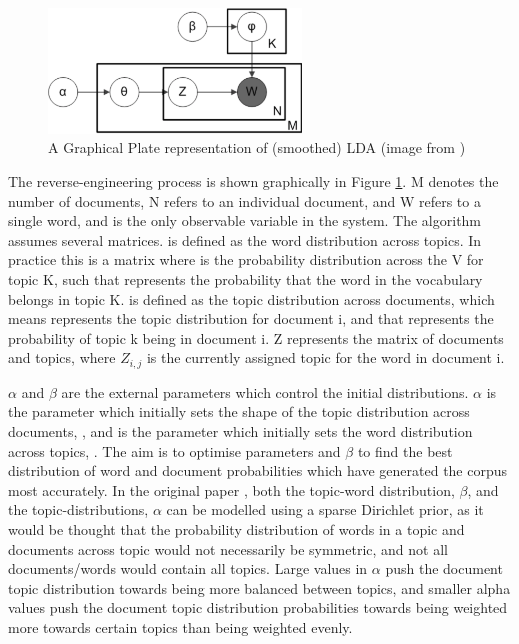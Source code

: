 \begin{figure}[H]
	\centering
	\includegraphics[width=0.6\textwidth]{images/LDA.png}
	\caption{A Graphical Plate representation of (smoothed) LDA (image from \cite{LDA})}
	\label{fig:ldafigure}
\end{figure}

The reverse-engineering process is shown graphically in Figure \ref{fig:ldafigure}. M denotes the number of documents, N refers to an individual document, and W refers to a single word, and is the only observable variable in the system. The algorithm assumes several matrices. \boldmath{$\varphi$} is defined as the word distribution across topics. In practice this is a matrix where  is the probability distribution across the V for topic K, such that  represents the probability that the  word in the vocabulary belongs in topic K. \boldmath{$\theta$} is defined as the topic distribution across documents, which means  represents the topic distribution for document i, and that  represents the probability of topic k being in document i. \textbf{}{Z} represents the matrix of documents and topics, where \textbf{$Z_{i,j}$} is the currently assigned topic for the  word in document i. 

$\alpha$ and $\beta$ are the external parameters which control the initial distributions. $\alpha$ is the parameter which initially sets the shape of the topic distribution across documents, \boldmath{$\theta$}, and \unboldmath{$\beta$} is the parameter which initially sets the word distribution across topics, \boldmath{$\varphi$}. The aim is to optimise parameters \unboldmath{$\alpha$} and $\beta$ to find the best distribution of word and document probabilities which have generated the corpus most accurately. In the original paper \cite{blei2003latent}, both the topic-word distribution, $\beta$, and the topic-distributions, $\alpha$ can be modelled using a sparse Dirichlet prior, as it would be thought that the probability distribution of words in a topic and documents across topic would not necessarily be symmetric, and not all documents/words would contain all topics. Large values in $\alpha$ push the document topic distribution towards being more balanced between topics, and smaller alpha values push the document topic distribution probabilities towards being weighted more towards certain topics than being weighted evenly. 

